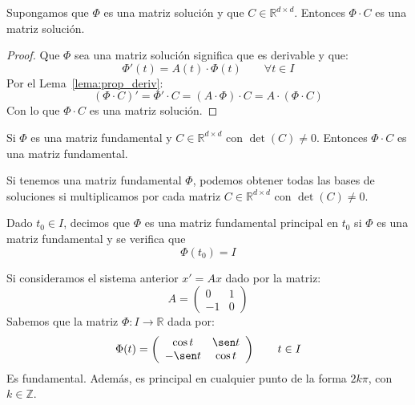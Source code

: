 \begin{prop}
    Supongamos que $\Phi$ es una matriz solución y que $C\in \mathbb{R}^{d\times d}$. Entonces $\Phi\cdot C$ es una matriz solución.
    \begin{proof}
        Que $\Phi$ sea una matriz solución significa que es derivable y que:
        \begin{equation*}
            \Phi'(t) = A(t)\cdot \Phi(t) \qquad \forall t\in I
        \end{equation*}
        Por el Lema~\ref{lema:prop_deriv}:
        \begin{equation*}
            (\Phi\cdot C)' = \Phi'\cdot C = (A\cdot \Phi)\cdot C = A\cdot (\Phi \cdot C)
        \end{equation*}
        Con lo que $\Phi\cdot C$ es una matriz solución.
    \end{proof}
\end{prop}

\begin{coro}\label{cor:matriz_fundamental}
    Si $\Phi$ es una matriz fundamental y $C\in \mathbb{R}^{d\times d}$ con $\det(C)\neq 0$. Entonces $\Phi\cdot C$ es una matriz fundamental.
\end{coro}

\begin{ejercicio*}
    Si tenemos una matriz fundamental $\Phi$, podemos obtener todas las bases de soluciones si multiplicamos por cada matriz $C\in \mathbb{R}^{d\times d}$ con $\det(C)\neq 0$.
\end{ejercicio*}

\begin{definicion}
    Dado $t_0\in I$, decimos que $\Phi$ es una matriz fundamental principal en $t_0$ si $\Phi$ es una matriz fundamental y se verifica que
    \begin{equation*}
        \Phi(t_0) = I
    \end{equation*}
\end{definicion}

\begin{ejemplo}
    Si consideramos el sistema anterior $x' = Ax$ dado por la matriz:
    \begin{equation*}
        A = \left(\begin{array}{cc}
                0 & 1 \\
                -1 & 0
        \end{array}\right)
    \end{equation*}
    Sabemos que la matriz $\Phi:I\rightarrow\mathbb{R}$ dada por:
    \begin{equation*}
        \Phi(t) = \left(\begin{array}{cc}
                \cos t & \sen t \\
                -\sen t & \cos t
        \end{array}\right) \qquad t\in I
    \end{equation*}
    Es fundamental. Además, es principal en cualquier punto de la forma $2k\pi$, con $k\in \mathbb{Z}$.
\end{ejemplo}

